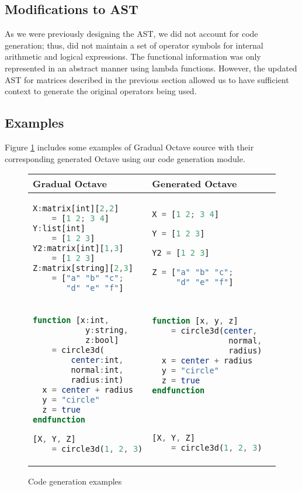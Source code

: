 \subsection{Modifications to AST}
As we were previously designing the AST, we did not account for code generation; thus, did not maintain a set of operator symbols for internal arithmetic and logical expressions. The functional information was only represented in an abstract manner using lambda functions. However, the updated AST for matrices described in the previous section allowed us to have sufficient context to generate the original operators being used.

\subsection{Examples}
Figure \ref{fig:codegen} includes some examples of Gradual Octave source with their corresponding generated Octave using our code generation module.

\lstset{
    basicstyle=\ttfamily,
    columns=fullflexible,
    breaklines=true,
}

\begin{figure}[h]
\begin{tabular}{|p{4cm}|p{4cm}|p{4cm}|}
\hline
Gradual Octave  &  Generated Octave \\
\hline
    {\begin{lstlisting}[language=octave, numbers=none]
X:matrix[int][2,2]
    = [1 2; 3 4]
Y:list[int]
    = [1 2 3]
Y2:matrix[int][1,3]
    = [1 2 3]
Z:matrix[string][2,3]
    = ["a" "b" "c";
       "d" "e" "f"]
    \end{lstlisting}} &
    {\begin{lstlisting}[language=octave, numbers=none]
X = [1 2; 3 4]

Y = [1 2 3]

Y2 = [1 2 3]

Z = ["a" "b" "c";
     "d" "e" "f"]
    \end{lstlisting}} \\
\hline
    {\begin{lstlisting}[language=octave, numbers=none]
function [x:int,
           y:string,
           z:bool]
    = circle3d(
        center:int,
        normal:int,
        radius:int)
  x = center + radius
  y = "circle"
  z = true
endfunction

[X, Y, Z]
    = circle3d(1, 2, 3)
    \end{lstlisting}} &
    {\begin{lstlisting}[language=octave, numbers=none]
function [x, y, z]
    = circle3d(center,
                normal,
                radius)
  x = center + radius
  y = "circle"
  z = true
endfunction




[X, Y, Z]
    = circle3d(1, 2, 3)
    \end{lstlisting}} \\
\hline
\end{tabular}
\caption{Code generation examples}
\label{fig:codegen}
\end{figure}

